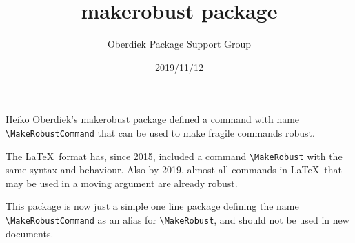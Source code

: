 \documentclass{article}
\title{makerobust package}
\author{Oberdiek Package Support Group}
\date{2019/11/12}
\begin{document}
\maketitle

Heiko Oberdiek's \textsf{makerobust} package defined a command with name
\verb|\MakeRobustCommand| that can be used to make fragile commands
robust.

The \LaTeX\ format has, since 2015, included a command
\verb|\MakeRobust| with the same syntax and behaviour.  Also by 2019,
almost all commands in \LaTeX\ that may be used in a moving argument
are already robust.

This package is now just a simple one line package defining the name 
\verb|\MakeRobustCommand| as an alias for \verb|\MakeRobust|, and
should not be used in new documents.
\end{document}
